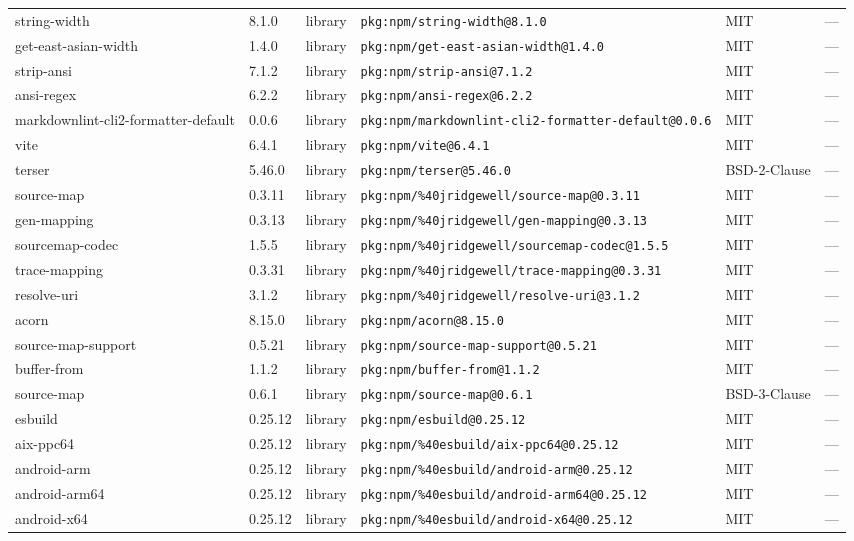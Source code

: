 \documentclass[11pt]{article}
\begin{document}
\begin{longtable}{|l|l|l|p{2.2cm}|l|p{4cm}|}
string-width & 8.1.0 & library & \texttt{pkg:npm/string-width@8.1.0} & MIT & — \\
get-east-asian-width & 1.4.0 & library & \texttt{pkg:npm/get-east-asian-width@1.4.0} & MIT & — \\
strip-ansi & 7.1.2 & library & \texttt{pkg:npm/strip-ansi@7.1.2} & MIT & — \\
ansi-regex & 6.2.2 & library & \texttt{pkg:npm/ansi-regex@6.2.2} & MIT & — \\
markdownlint-cli2-formatter-default & 0.0.6 & library & \texttt{pkg:npm/markdownlint-cli2-formatter-default@0.0.6} & MIT & — \\
vite & 6.4.1 & library & \texttt{pkg:npm/vite@6.4.1} & MIT & — \\
terser & 5.46.0 & library & \texttt{pkg:npm/terser@5.46.0} & BSD-2-Clause & — \\
source-map & 0.3.11 & library & \texttt{pkg:npm/\%40jridgewell/source-map@0.3.11} & MIT & — \\
gen-mapping & 0.3.13 & library & \texttt{pkg:npm/\%40jridgewell/gen-mapping@0.3.13} & MIT & — \\
sourcemap-codec & 1.5.5 & library & \texttt{pkg:npm/\%40jridgewell/sourcemap-codec@1.5.5} & MIT & — \\
trace-mapping & 0.3.31 & library & \texttt{pkg:npm/\%40jridgewell/trace-mapping@0.3.31} & MIT & — \\
resolve-uri & 3.1.2 & library & \texttt{pkg:npm/\%40jridgewell/resolve-uri@3.1.2} & MIT & — \\
acorn & 8.15.0 & library & \texttt{pkg:npm/acorn@8.15.0} & MIT & — \\
source-map-support & 0.5.21 & library & \texttt{pkg:npm/source-map-support@0.5.21} & MIT & — \\
buffer-from & 1.1.2 & library & \texttt{pkg:npm/buffer-from@1.1.2} & MIT & — \\
source-map & 0.6.1 & library & \texttt{pkg:npm/source-map@0.6.1} & BSD-3-Clause & — \\
esbuild & 0.25.12 & library & \texttt{pkg:npm/esbuild@0.25.12} & MIT & — \\
aix-ppc64 & 0.25.12 & library & \texttt{pkg:npm/\%40esbuild/aix-ppc64@0.25.12} & MIT & — \\
android-arm & 0.25.12 & library & \texttt{pkg:npm/\%40esbuild/android-arm@0.25.12} & MIT & — \\
android-arm64 & 0.25.12 & library & \texttt{pkg:npm/\%40esbuild/android-arm64@0.25.12} & MIT & — \\
android-x64 & 0.25.12 & library & \texttt{pkg:npm/\%40esbuild/android-x64@0.25.12} & MIT & — \\

\end{longtable}
\end{document}
